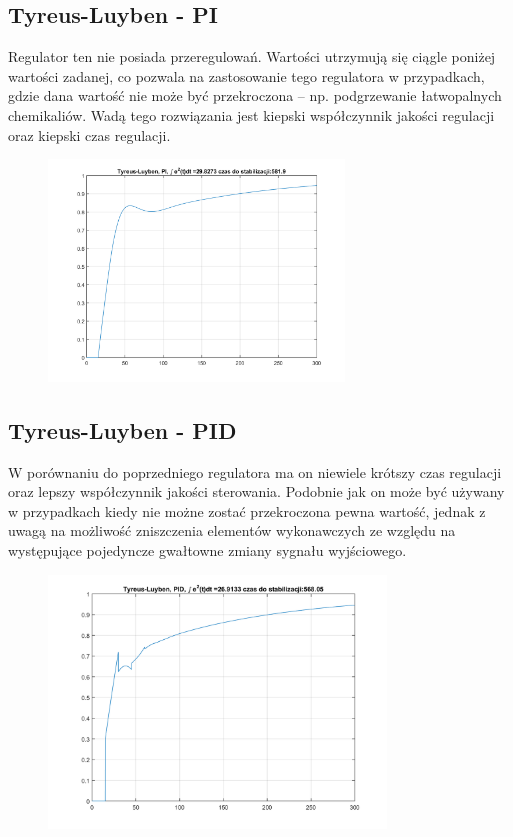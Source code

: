 \documentclass[a4paper, 12pt]{article}
\begin{document}
		\subsection{Tyreus-Luyben - PI}
			Regulator ten nie posiada przeregulowań. Wartości utrzymują się ciągle poniżej wartości zadanej, co pozwala na zastosowanie tego regulatora w przypadkach, gdzie dana wartość nie może być przekroczona -- np. podgrzewanie łatwopalnych chemikaliów. Wadą tego rozwiązania jest kiepski współczynnik jakości regulacji oraz kiepski czas regulacji.
			\begin{figure}[H]
				\centering
				\includegraphics[width = 0.7\textwidth]{./img/Tyr-Luy_PI.png}
			\end{figure}
		\subsection{Tyreus-Luyben - PID}
			W porównaniu do poprzedniego regulatora ma on niewiele krótszy czas regulacji oraz lepszy współczynnik jakości sterowania. Podobnie jak on może być używany w przypadkach kiedy nie możne zostać przekroczona pewna wartość, jednak z uwagą na możliwość zniszczenia elementów wykonawczych ze względu na występujące pojedyncze gwałtowne zmiany sygnału wyjściowego.
			\begin{figure}[H]
				\centering
				\includegraphics[width = 0.8\textwidth]{./img/Tyr-Luy_PID.png}
			\end{figure}				
\end{document}
